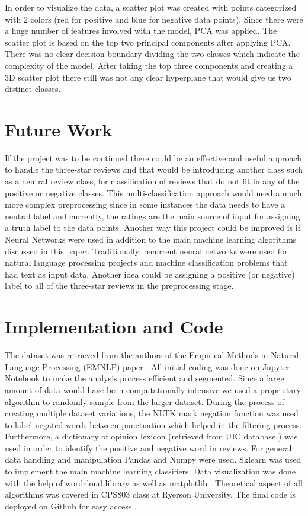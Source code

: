 \documentclass[conference , 11pt]{IEEEtran}
\begin{document}
\FloatBarrier
In order to visualize the data, a scatter plot was created with points categorized with 2 colors (red for positive and blue for negative data points). Since there were a huge number of features involved with the model, PCA was applied. The scatter plot is based on the top two principal components after applying PCA. There was no clear decision boundary dividing the two classes which indicate the complexity of the model. After taking the top three components and creating a 3D scatter plot there still was not any clear hyperplane that would give us two distinct classes.

\section{Future Work}
If the project was to be continued there could be an effective and useful approach to handle the three-star reviews and that would be introducing another class such as a neutral review class, for classification of reviews that do not fit in any of the positive or negative classes. This multi-classification approach would need a much more complex preprocessing since in some instances the data needs to have a neutral label and currently, the ratings are the main source of input for assigning a truth label to the data points. Another way this project could be improved is if Neural Networks were used in addition to the main machine learning algorithms discussed in this paper. Traditionally, recurrent neural networks were used for natural language processing projects and machine classification problems that had text as input data. Another  idea could be assigning a positive (or negative) label to all of the three-star reviews in the preprocessing stage.


\section{Implementation and Code}

The dataset was retrieved from the authors of the Empirical Methods in Natural Language Processing (EMNLP) paper \cite{dataset}. All initial coding was done on Jupyter Notebook \cite{juypter} to make the analysis process efficient and segmented. Since a large amount of data would have been computationally intensive we used a proprietary algorithm to randomly sample from the larger dataset. During the process of creating multiple dataset variations, the NLTK  \cite{nltk} mark negation function was used to label negated words between punctuation which helped in the filtering process. Furthermore, a dictionary of opinion lexicon (retrieved from UIC database \cite{opinion}) was used in order to identify the positive and negative word in reviews. For general data handling and manipulation Pandas \cite{pandas} and Numpy \cite{numpy} were used. Sklearn \cite{sklearn} was used to implement the main machine learning classifiers. Data visualization was done with the help of wordcloud \cite{wordcloud} library as well as matplotlib \cite{matplot}. Theoretical aspect of all algorithms was covered in CPS803 class at Ryerson University. The final code is deployed on Github for easy access \cite{github}.
\end{document}
